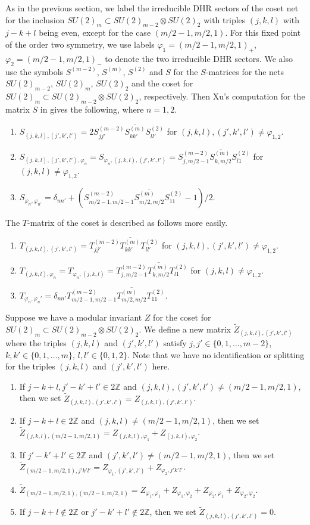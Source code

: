 \documentclass[11pt]{article}
\def\phi{\varphi}
\def\Z{{\mathbb Z}}
\begin{document}
As in the previous section, we label the irreducible DHR
sectors of the coset net for the inclusion
$SU(2)_m\subset SU(2)_{m-2}\otimes SU(2)_2$ with
triples $(j,k,l)$ with $j-k+l$ being even, except for the
case $(m/2-1, m/2, 1)$.  For this fixed point of the order
two symmetry, we use labels $\phi_1=(m/2-1, m/2, 1)_+$, 
$\phi_2=(m/2-1, m/2, 1)_-$ to denote the two
irreducible DHR sectors.  We also use the symbols
$S^{(m-2)}$, $S^{(m)}$, $S^{(2)}$ and $S$ for the $S$-matrices
for the nets $SU(2)_{m-2}$, $SU(2)_m$, $SU(2)_2$ and the coset
for $SU(2)_m\subset SU(2)_{m-2}\otimes SU(2)_2$, respectively.
Then Xu's computation for the matrix
$S$ in \cite{X3} gives the following, where $n=1,2$.
%
\begin{enumerate}
\item $S_{(j,k,l),(j',k',l')}=2S^{(m-2)}_{jj'} \overline{S^{(m)}_{kk'}}
S^{(2)}_{ll'}$ for $(j,k,l), (j',k',l')\neq \phi_{1,2}$.
\item $S_{(j,k,l),(j',k',l'),\phi_n}=S_{\phi_n,(j,k,l),(j',k',l')}=
S^{(m-2)}_{j,m/2-1} \overline{S^{(m)}_{k,m/2}}
S^{(2)}_{l1}$ for $(j,k,l)\neq \phi_{1,2}$.
\item $S_{\phi_n,\phi_{n'}}=\delta_{nn'}+(S^{(m-2)}_{m/2-1,m/2-1}
\overline{S^{(m)}_{m/2,m/2}}S^{(2)}_{11}-1)/2$.
\end{enumerate}
%
The $T$-matrix of the coset is described as follows more easily.
%
\begin{enumerate}
\item $T_{(j,k,l),(j',k',l')}=T^{(m-2)}_{jj'} \overline{T^{(m)}_{kk'}}
T^{(2)}_{ll'}$ for $(j,k,l), (j',k',l')\neq \phi_{1,2}$.
\item $T_{(j,k,l),\phi_n}=T_{\phi_n,(j,k,l)}=
T^{(m-2)}_{j,m/2-1} \overline{T^{(m)}_{k,m/2}}
T^{(2)}_{l1}$ for $(j,k,l)\neq \phi_{1,2}$.
\item $T_{\phi_n,\phi_n'}=\delta_{nn'}
T^{(m-2)}_{m/2-1,m/2-1} \overline{T^{(m)}_{m/2,m/2}}
T^{(2)}_{11}$.
\end{enumerate}
%
Suppose we have a modular invariant $Z$ for the coset
for $SU(2)_m\subset SU(2)_{m-2}\otimes SU(2)_2$.
We define a new matrix  $\tilde Z_{(j,k,l),(j',k',l')}$ where
the triples $(j,k,l)$ and $(j',k',l')$ satisfy
$j,j'\in \{0,1,\dots,m-2\}$,
$k,k'\in \{0,1,\dots,m\}$,
$l,l'\in \{0,1,2\}$.  Note that we have no identification
or splitting for the triples $(j,k,l)$ and $(j',k',l')$ here.
%
\begin{enumerate}
\item If $j-k+l, j'-k'+l'\in 2\Z$ and
$(j,k,l), (j',k',l')\neq(m/2-1,m/2,1)$, then
we set $\tilde Z_{(j,k,l),(j',k',l')}=Z_{(j,k,l),(j',k',l')}$.
\item If $j-k+l\in 2\Z$ and
$(j,k,l)\neq(m/2-1,m/2,1)$, then
we set $\tilde Z_{(j,k,l),(m/2-1,m/2,1)}=
Z_{(j,k,l),\phi_1}+Z_{(j,k,l),\phi_2}$.
\item If $j'-k'+l'\in 2\Z$ and
$(j',k',l')\neq(m/2-1,m/2,1)$, then
we set $\tilde Z_{(m/2-1,m/2,1),j'k'l'}=
Z_{\phi_1,(j',k',l')}+Z_{\phi_2,j'k'l'}$.
\item $\tilde Z_{(m/2-1,m/2,1),(m/2-1,m/2,1)}=
Z_{\phi_1,\phi_1}+Z_{\phi_1,\phi_2}+Z_{\phi_2,\phi_1}+Z_{\phi_2,\phi_2}$.
\item If $j-k+l\notin 2\Z$ or $j'-k'+l'\notin 2\Z$, then
we set $\tilde Z_{(j,k,l),(j',k',l')}=0$.
\end{enumerate}
\end{document}
